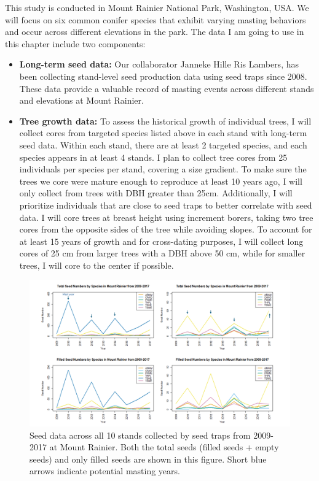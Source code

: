 \documentclass[11pt,letter]{article}
\begin{document}
This study is conducted in Mount Rainier National Park, Washington, USA. We will focus on six common conifer species that exhibit varying masting behaviors and occur across different elevations in the park. The data I am going to use in this chapter include two components:
\begin{itemize}
	\item \textbf{Long-term seed data:} Our collaborator Janneke Hille Ris Lambers, has been collecting stand-level seed production data using seed traps since 2008. These data provide a valuable record of masting events across different stands and elevations at Mount Rainier.
	\item \textbf{Tree growth data:}  To assess the historical growth of individual trees, I will collect cores from targeted species listed above in each stand with long-term seed data. Within each stand, there are at least 2 targeted species, and each species appears in at least 4 stands. I plan to collect tree cores from 25 individuals per species per stand, covering a size gradient. To make sure the trees we core were mature enough to reproduce at least 10 years ago, I will only collect from trees with DBH greater than 25cm. Additionally, I will prioritize individuals that are close to seed traps to better correlate with seed data. I will core trees at breast height using increment borers, taking two tree cores from the opposite sides of the tree while avoiding slopes. To account for at least 15 years of growth and for cross-dating purposes, I will collect long cores of 25 cm from larger trees with a DBH above 50 cm, while for smaller trees, I will core to the center if possible.
	\end{itemize}
\begin{figure}[htb]
	\centering
	\includegraphics[width=1\linewidth]{seed.png}
	\caption{Seed data across all 10 stands collected by seed traps from 2009-2017 at Mount Rainier. Both the total seeds (filled seeds + empty seeds) and only filled seeds are shown in this figure. Short blue arrows indicate potential masting years.}
	\label{fig:sites}
\end{figure}	
\end{document}
